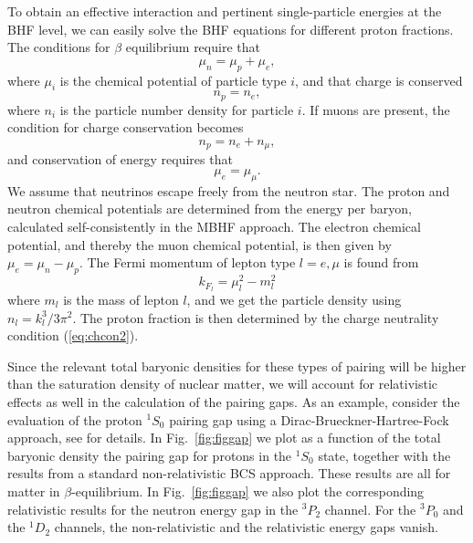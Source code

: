 \documentclass[rmp,aps,floatfix]{revtex4}
\begin{document}
To obtain an effective interaction and pertinent single-particle
energies at the BHF level, we can easily solve
the BHF equations 
for different proton fractions.
The conditions for $\beta$ equilibrium require
that 
\begin{equation}
     \mu_{n}=\mu_{p}+\mu_{e},
\end{equation}
where $\mu_i$ is the chemical potential of particle type $i$, 
and that charge is conserved
\begin{equation}
     n_{p}=n_{e},
\end{equation}
where $n_{i}$ is the particle number density for particle $i$.  If 
muons are present, the condition for charge conservation becomes 
\begin{equation}
n_{p}=n_{e}+n_{\mu},
\label{eq:chcon2}
\end{equation}
and conservation of energy requires that 
\begin{equation}
\mu_{e}=\mu_{\mu}.
\end{equation}
We assume that neutrinos escape freely from the neutron star.  
The proton and neutron chemical potentials are determined from the 
energy per baryon, calculated self-consistently in the MBHF approach.  
The electron chemical potential, and thereby the muon chemical potential, 
is then given by $\mu_{e}=\mu_{n}-\mu_{p}$.  The Fermi momentum of lepton 
type $l=e,\mu$ is found from 
\begin{equation}
k_{F_{l}}=\mu_{l}^{2}-m_{l}^{2}
\end{equation}
where $m_{l}$ is the mass of lepton $l$, and we get the particle density 
using $n_{l}=k_{l}^{3}/3\pi^{2}$.  The proton fraction is then determined 
by the charge neutrality condition (\ref{eq:chcon2}).



Since the relevant total baryonic densities for these types of
pairing will be higher than the saturation
density of nuclear matter, we will account for relativistic
effects as well in the calculation of the pairing gaps.
As an example, consider the evaluation of the proton
$^1S_0$ pairing gap using a Dirac-Brueckner-Hartree-Fock  approach,
see \cite{elga96,pair1} for details.
In Fig.\ \ref{fig:figgap} we plot as a function of the total baryonic 
density the pairing gap for protons in the $^1S_0$
state, together with the results from a standard non-relativistic 
BCS approach.
These results are all 
for matter in $\beta$-equilibrium. In Fig.\ \ref{fig:figgap} 
we also plot the 
corresponding relativistic 
results for the neutron energy gap in the $^3P_2$ channel. 
For the 
$^3P_0$ and the $^1D_2$ channels,
the non-relativistic and the relativistic
energy gaps vanish. 
\end{document}
